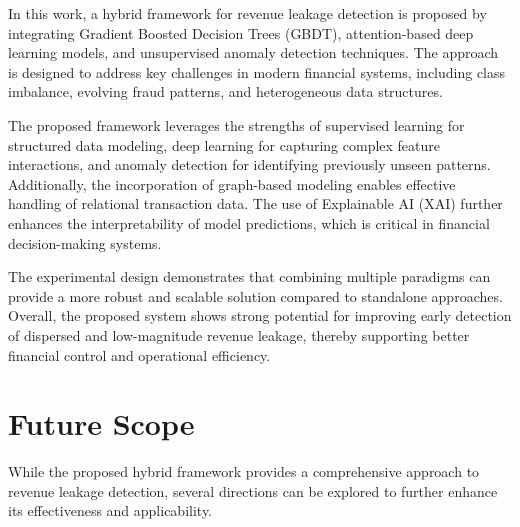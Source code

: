 \documentclass[conference]{IEEEtran}
\begin{document}
In this work, a hybrid framework for revenue leakage detection is proposed by integrating Gradient Boosted Decision Trees (GBDT), attention-based deep learning models, and unsupervised anomaly detection techniques. The approach is designed to address key challenges in modern financial systems, including class imbalance, evolving fraud patterns, and heterogeneous data structures.

The proposed framework leverages the strengths of supervised learning for structured data modeling, deep learning for capturing complex feature interactions, and anomaly detection for identifying previously unseen patterns. Additionally, the incorporation of graph-based modeling enables effective handling of relational transaction data. The use of Explainable AI (XAI) further enhances the interpretability of model predictions, which is critical in financial decision-making systems.

The experimental design demonstrates that combining multiple paradigms can provide a more robust and scalable solution compared to standalone approaches. Overall, the proposed system shows strong potential for improving early detection of dispersed and low-magnitude revenue leakage, thereby supporting better financial control and operational efficiency.



\section{Future Scope}

While the proposed hybrid framework provides a comprehensive approach to revenue leakage detection, several directions can be explored to further enhance its effectiveness and applicability.
\end{document}
